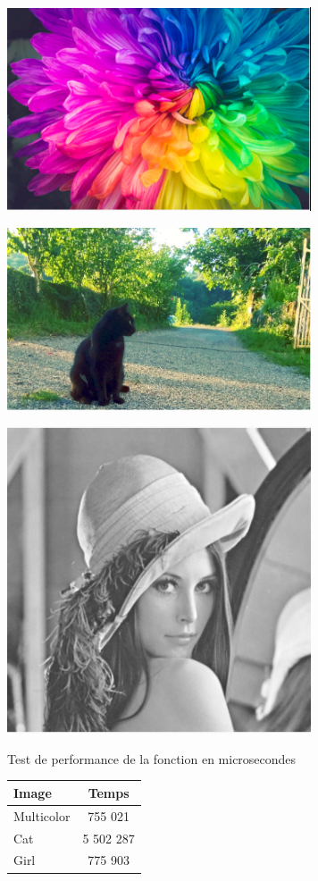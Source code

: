 \documentclass{article}
\begin{document}
\begin{center} 
    \includegraphics[width=9cm]{../Image_fonctions/Multicolor/Brightness+1.PNG}
\end{center}
\begin{center} 
    \includegraphics[width=9cm]{../Image_fonctions/Cat/Brightness+1.PNG}
\end{center}
\begin{center} 
    \includegraphics[width=9cm]{../Image_fonctions/Lenna/Brightness+1.PNG}
\end{center}

\begin{center}
\medbreak
Test de performance de la fonction en microsecondes
\bigbreak
   \begin{tabular}{ | l | c | }
     \hline
     Image & Temps \\
     \hline
     Multicolor & 755 021 \\
     \hline
     Cat & 5 502 287 \\
     \hline
     Girl & 775 903 \\
     \hline
   \end{tabular}
 \end{center}
\bigbreak
\end{document}
